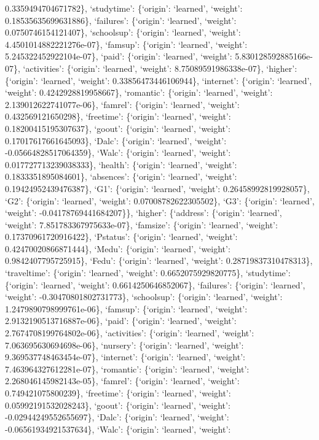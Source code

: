 \documentclass[
]{article}
\begin{document}
0.3359494704671782\}, `studytime': \{`origin': `learned', `weight':
0.18535635699631886\}, `failures': \{`origin': `learned', `weight':
0.0750746154121407\}, `schoolsup': \{`origin': `learned', `weight':
4.4501014882221276e-07\}, `famsup': \{`origin': `learned', `weight':
5.245322452922104e-07\}, `paid': \{`origin': `learned', `weight':
5.830128592885166e-07\}, `activities': \{`origin': `learned', `weight':
8.75089591986338e-07\}, `higher': \{`origin': `learned', `weight':
0.33856473446106944\}, `internet': \{`origin': `learned', `weight':
0.4242928819958667\}, `romantic': \{`origin': `learned', `weight':
2.139012622741077e-06\}, `famrel': \{`origin': `learned', `weight':
0.432569121650298\}, `freetime': \{`origin': `learned', `weight':
0.18200415195307637\}, `goout': \{`origin': `learned', `weight':
0.17017617661645093\}, `Dalc': \{`origin': `learned', `weight':
-0.05664828517064359\}, `Walc': \{`origin': `learned', `weight':
0.017727713239038333\}, `health': \{`origin': `learned', `weight':
0.1833351895084601\}, `absences': \{`origin': `learned', `weight':
0.19424952439476387\}, `G1': \{`origin': `learned', `weight':
0.26458992819928057\}, `G2': \{`origin': `learned', `weight':
0.07008782622305502\}, `G3': \{`origin': `learned', `weight':
-0.04178769441684207\}\}, `higher': \{`address': \{`origin': `learned',
`weight': 7.851783367975633e-07\}, `famsize': \{`origin': `learned',
`weight': 0.17370961720916422\}, `Pstatus': \{`origin': `learned',
`weight': 0.42470020866871444\}, `Medu': \{`origin': `learned',
`weight': 0.9842407795725915\}, `Fedu': \{`origin': `learned', `weight':
0.28719837310478313\}, `traveltime': \{`origin': `learned', `weight':
0.6652075929820775\}, `studytime': \{`origin': `learned', `weight':
0.6614250646852067\}, `failures': \{`origin': `learned', `weight':
-0.30470801802731773\}, `schoolsup': \{`origin': `learned', `weight':
1.2479890798999761e-06\}, `famsup': \{`origin': `learned', `weight':
2.9132190513716887e-06\}, `paid': \{`origin': `learned', `weight':
2.7674708199764802e-06\}, `activities': \{`origin': `learned', `weight':
7.063695630694698e-06\}, `nursery': \{`origin': `learned', `weight':
9.369537748463454e-07\}, `internet': \{`origin': `learned', `weight':
7.463964327612281e-07\}, `romantic': \{`origin': `learned', `weight':
2.268046145982143e-05\}, `famrel': \{`origin': `learned', `weight':
0.749421075800239\}, `freetime': \{`origin': `learned', `weight':
0.05992191532028243\}, `goout': \{`origin': `learned', `weight':
-0.02944249552655697\}, `Dalc': \{`origin': `learned', `weight':
-0.06561934921537634\}, `Walc': \{`origin': `learned', `weight':
\end{document}
